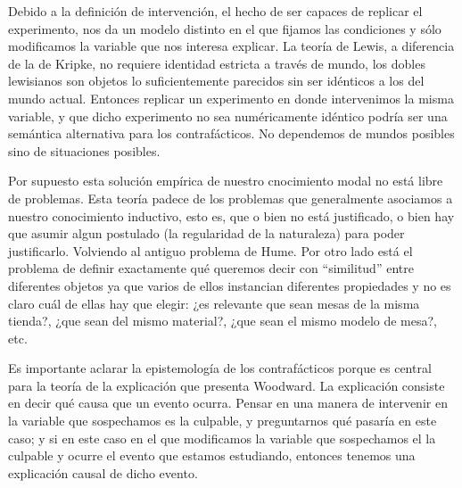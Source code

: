 Debido a la definición de intervención, el hecho de ser capaces de replicar el experimento, nos da un modelo distinto en el que fijamos las condiciones y sólo modificamos la variable que nos interesa explicar. La teoría de Lewis, a diferencia de la de Kripke, no requiere identidad estricta a través de mundo, los dobles lewisianos son objetos lo suficientemente parecidos sin ser idénticos a los del mundo actual. Entonces replicar un experimento en donde intervenimos la misma variable, y que dicho experimento no sea numéricamente idéntico podría ser una semántica alternativa para los contrafácticos. No dependemos de mundos posibles sino de situaciones posibles.

Por supuesto esta solución empírica de nuestro cnocimiento modal no está libre de problemas. Esta teoría padece de los problemas que generalmente asociamos a nuestro conocimiento inductivo, esto es, que o bien no está justificado, o bien hay que asumir algun postulado (la regularidad de la naturaleza) para poder justificarlo. Volviendo al antiguo problema de Hume. Por otro lado está el problema de definir exactamente qué queremos decir con ``similitud'' entre diferentes objetos ya que varios de ellos instancian diferentes propiedades y no es claro cuál de ellas hay que elegir: ¿es relevante que sean mesas de la misma tienda?, ¿que sean del mismo material?, ¿que sean el mismo modelo de mesa?, etc.


Es importante aclarar la epistemología de los contrafácticos porque es central para la teoría de la explicación que presenta Woodward. La explicación consiste en decir qué causa que un evento ocurra. Pensar en una manera de intervenir en la variable que sospechamos es la culpable, y preguntarnos qué pasaría en este caso; y si en este caso en el que modificamos la variable que sospechamos el la culpable y ocurre el evento que estamos estudiando, entonces tenemos una explicación causal de dicho evento.

